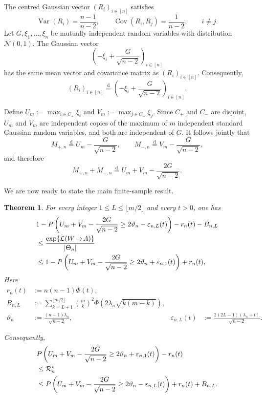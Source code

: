 \documentclass[11pt]{article}
\newtheorem{theorem}{Theorem}[section]
\theoremstyle{definition}
\theoremstyle{remark}
\newcommand{\1}{\boldsymbol{1}}
\newcommand{\ml}[2]{\mathcal{L}(#1\!\to\!#2)}
\begin{document}
The centred Gaussian vector $(R_i)_{i\in[n]}$ satisfies
\[
\operatorname{Var}(R_i)
=
\frac{n-1}{n-2},
\qquad
\operatorname{Cov}(R_i,R_j)
=
\frac{1}{n-2},
\qquad
i\neq j.
\]
Let \(G,\xi_1,\ldots,\xi_n\) be mutually independent random variables with distribution
$\mathcal N(0,1)$. The Gaussian vector
\[
\left(
-\xi_i+\frac{G}{\sqrt{n-2}}
\right)_{i\in[n]}
\]
has the same mean vector and covariance matrix as
$(R_i)_{i\in[n]}$. Consequently,
\[
(R_i)_{i\in[n]}
\overset{\mathrm d}{=}
\left(
-\xi_i+\frac{G}{\sqrt{n-2}}
\right)_{i\in[n]}.
\]

Define \(U_m:=\max_{i\in C_+}\xi_i\) and
\(V_m:=\max_{j\in C_-}\xi_j\).
Since $C_+$ and $C_-$ are disjoint, $U_m$ and $V_m$ are independent
copies of the maximum of $m$ independent standard Gaussian random
variables, and both are independent of $G$. It follows jointly that
\[
M_{+,n}
\overset{\mathrm d}{=}
U_m-\frac{G}{\sqrt{n-2}},
\qquad
M_{-,n}
\overset{\mathrm d}{=}
V_m-\frac{G}{\sqrt{n-2}},
\]
and therefore
\[
M_{+,n}+M_{-,n}
\overset{\mathrm d}{=}
U_m+V_m-\frac{2G}{\sqrt{n-2}}.
\]

We are now ready to state the main finite-sample result.

\begin{theorem}
\label{thm:gwsbmFiniteLeakage}
For every integer \(1\leq L\leq\lfloor m/2\rfloor\) and every \(t>0\),
one has
\begin{align}
&
1-
P\left(
U_m+V_m-\frac{2G}{\sqrt{n-2}}
\geq
2\vartheta_n-\varepsilon_{n,L}(t)
\right)
-r_n(t)-B_{n,L}
\notag\\
&\leq
\frac{\exp\{\ml{W}{A}\}}{|\Theta_n|}
\notag\\
&\leq
1-
P\left(
U_m+V_m-\frac{2G}{\sqrt{n-2}}
\geq
2\vartheta_n+\varepsilon_{n,1}(t)
\right)
+r_n(t),
\label{eq:gwsbmFiniteLeakageSandwich}
\end{align}
Here
\[
\begin{aligned}
r_n(t)&:=n(n-1)\overline\Phi(t),\\
B_{n,L}&:=
\sum_{k=L+1}^{\lfloor m/2\rfloor}
\binom{m}{k}^{2}
\overline\Phi\!\left(2\lambda_n\sqrt{k(m-k)}\right),\\
\vartheta_n&:=\frac{(n-1)\lambda_n}{\sqrt{n-2}},
&
\varepsilon_{n,L}(t)&:=
\frac{2(2L-1)(\lambda_n+t)}{\sqrt{n-2}}.
\end{aligned}
\]

Consequently,
\begin{align}
&
P\left(
U_m+V_m-\frac{2G}{\sqrt{n-2}}
\geq
2\vartheta_n+\varepsilon_{n,1}(t)
\right)
-r_n(t)
\notag\\
&\leq
\mathcal R_n^\star
\notag\\
&\leq
P\left(
U_m+V_m-\frac{2G}{\sqrt{n-2}}
\geq
2\vartheta_n-\varepsilon_{n,L}(t)
\right)
+r_n(t)+B_{n,L}.
\label{eq:gwsbmFiniteRiskSandwich}
\end{align}
\end{theorem}
\end{document}
